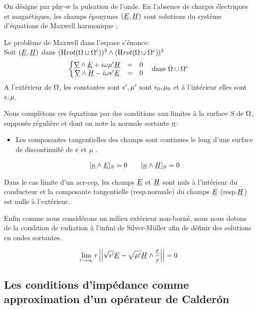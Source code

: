On désigne par \gls{phy-w} la pulsation de l'onde.
En l'absence de charges électriques et magnétiques, les champs éponymes $( \underline{E}, \underline{H} )$ sont solutions du système d'équations de Maxwell harmonique : 

Le problème de Maxwell dans l'espace s'énonce: \\

Soit $(\underline{E},\underline{H})$ dans $(\mathrm{H}_\mathrm{{}}{rot}(\Omega\cup\Omega^c))^3 \wedge (\mathrm{H}_\mathrm{{}}{rot}(\Omega\cup\Omega^c))^3$
\begin{equation}
\label{eq:pres_th:intro:maxwell}
\left\lbrace \begin{matrix}
\underline{\nabla} \wedge \underline{E} + i\omega\mu' \underline{H} &=& 0 \\
\underline{\nabla} \wedge \underline{H} - i\omega\epsilon' \underline{E} &=& 0 \\
\end{matrix} \right.
\quad \text{dans $\Omega\cup\Omega^c$}
\end{equation}
A l'extérieur de $\Omega$, les constantes sont $\epsilon',\mu'$ sont $\epsilon_0,\mu_0$ et à l'intérieur elles sont $\epsilon,\mu$.


Nous complétons ces équations par des conditions aux limites à la surface $S$ de $\Omega$, supposée régulière et dont on note la normale sortante $\underline{n}$:
\begin{itemize}
  \item Les composantes tangentielles des champs sont continues le long d'une surface de discontinuité de $\epsilon$ et $\mu$ \cite[(2.10) p.~8]{senior_approximate_1995}.

  \begin{align}
  \label{eq:pres_th:intro:transmissions}[\underline{n} \wedge \underline{E}]_S = 0  \qquad [\underline{n} \wedge \underline{H}]_S = 0
  \end{align}
\end{itemize}
Dans le cas limite d'un \gls{acr-cep}, les champs $\underline{E}$ et $\underline{H}$ sont nuls à l'intérieur du conducteur et la composante tangentielle (resp.normale) du champs $\underline{E}$ (resp.$\underline{H}$) est nulle à l'extérieur.


Enfin comme nous considérons un milieu extérieur non-borné, nous nous dotons de la condition de radiation à l'infini de Silver-Müller afin de définir des solutions en ondes sortantes.


\begin{equation}
\label{eq:pres_th:intro:silver-muller}
\lim_{r\rightarrow\infty}r\left|\left|\sqrt{\epsilon'}\underline{E} - \sqrt{\mu'}\underline{H}\wedge\dfrac{\underline{r}}{r}\right|\right| = 0
\end{equation} 

\subsection*{Les conditions d'impédance comme approximation d'un opérateur de Calderón}

